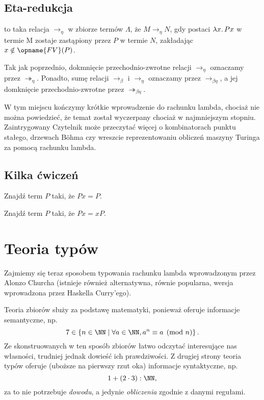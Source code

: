 \documentclass[polish,pretty]{angav}
\newcommand{\toto}{\twoheadrightarrow}
\newcommand{\FV}{\opname{FV}}
\begin{document}
\subsection{Eta-redukcja}

 to taka relacja $\to_\eta$ w zbiorze termów $\Lambda$, że $M \to_\eta N$, gdy  postaci $\lambda x\ldotp Px$ w termie M zostaje zastąpiony przez $P$ w termie $N$, zakładając $x \notin \FV(P)$.

Tak jak poprzednio, dokmnięcie przechodnio-zwrotne relacji $\to_\eta$ oznaczamy przez $\toto_\eta$. Ponadto, sumę relacji $\to_\beta$ i $\to_\eta$ oznaczamy przez $\to_{\beta\eta}$, a jej domknięcie przechodnio-zwrotne przez $\toto_{\beta\eta}$.


W tym miejscu kończymy krótkie wprowadzenie do rachunku lambda, chociaż nie można powiedzieć, że temat został wyczerpany chociaż w najmniejszym stopniu. Zaintrygowany Czytelnik może przeczytać więcej o kombinatorach punktu stałego, drzewach Böhma czy wreszcie reprezentowaniu obliczeń maszyny Turinga za pomocą rachunku lambda.

\subsection{Kilka ćwiczeń}

\begin{problem}
    Znajdź term $P$ taki, że $Px = P$.
\end{problem}

\begin{problem}
    Znajdź term $P$ taki, że $Px = xP$.
\end{problem}

\section{Teoria typów}

Zajmiemy się teraz sposobem typowania rachunku lambda wprowadzonym przez Alonzo Churcha (istnieje również alternatywna, równie popularna, wersja wprowadzona przez Haskella Curry'ego).



Teoria zbiorów służy za podstawę matematyki, ponieważ oferuje informacje semantyczne, np.
\[ 7 \in \left\{n \in \NN \mid \forall a \in \NN, a^n \equiv a \pmod{n} \right\}. \]
Ze skonstruowanych w ten sposób zbiorów łatwo odczytać interesujące nas własności, trudniej jednak dowieść ich prawdziwości.
Z drugiej strony teoria typów oferuje (uboższe na pierwszy rzut oka) informacje syntaktyczne, np.
\[ 1 + (2 \cdot 3) : \NN, \]
za to nie potrzebuje \emph{dowodu}, a jedynie \emph{obliczenia} zgodnie z danymi regułami.
\end{document}
